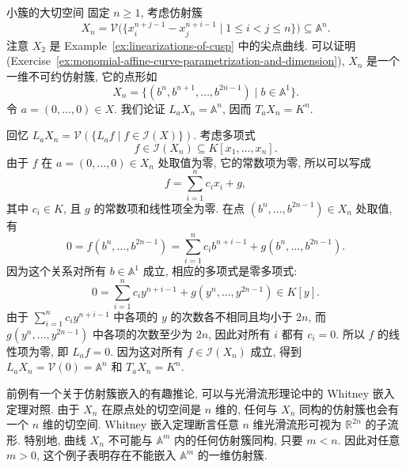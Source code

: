 \begin{Example}{小簇的大切空间}\leavevmode\label{ex:curves-with-arbitrarily-large-tangent-spaces}
固定 $n\geq1$, 考虑仿射簇
\[
  X_{n}=\mathcal{V}\bigl(\{x_{i}^{n+j-1}-x_{j}^{n+i-1}\mid1\leq i<j\leq n\}\bigr)
    \subseteq\mathbb{A}^{n}.
\]
注意 $X_{2}$ 是 Example~\ref{ex:linearizations-of-cusp} 中的尖点曲线. 可以证明 (Exercise~\ref{ex:monomial-affine-curve-parametrization-and-dimension}), $X_{n}$ 是一个一维不可约仿射簇, 它的点形如
\[
  X_{n}=\{(b^{n},b^{n+1},\ldots,b^{2n-1})\mid b\in\mathbb{A}^{1}\}.
\]
令 $a=(0,\ldots,0)\in X$. 我们论证 $L_{a}X_{n}=\mathbb{A}^{n}$, 因而 $T_{a}X_{n}=K^{n}$.

回忆 $L_{a}X_{n}=\mathcal{V}(\{L_{a}f\mid f\in\mathcal{I}(X)\})$. 考虑多项式
\[
  f\in\mathcal{I}(X_{n})\subseteq K[x_{1},\ldots,x_{n}].
\]
由于 $f$ 在 $a=(0,\ldots,0)\in X_{n}$ 处取值为零, 它的常数项为零, 所以可以写成
\[
  f=\sum_{i=1}^{n}c_{i}x_{i}+g,
\]
其中 $c_{i}\in K$, 且 $g$ 的常数项和线性项全为零. 在点 $(b^{n},\ldots,b^{2n-1})\in X_{n}$ 处取值, 有
\[
  0=f(b^{n},\ldots,b^{2n-1})
  =\sum_{i=1}^{n}c_{i}b^{n+i-1}+g(b^{n},\ldots,b^{2n-1}).
\]
因为这个关系对所有 $b\in\mathbb{A}^{1}$ 成立, 相应的多项式是零多项式:
\[
  0=\sum_{i=1}^{n}c_{i}y^{n+i-1}+g(y^{n},\ldots,y^{2n-1})\in K[y].
\]
由于 $\sum_{i=1}^{n}c_{i}y^{n+i-1}$ 中各项的 $y$ 的次数各不相同且均小于 $2n$, 而 $g(y^{n},\ldots,y^{2n-1})$ 中各项的次数至少为 $2n$, 因此对所有 $i$ 都有 $c_{i}=0$. 所以 $f$ 的线性项为零, 即 $L_{a}f=0$. 因为这对所有 $f\in\mathcal{I}(X_{n})$ 成立, 得到 $L_{a}X_{n}=\mathcal{V}(0)=\mathbb{A}^{n}$ 和 $T_{a}X_{n}=K^{n}$.
\end{Example}

\BookPairedNote
  {前例有一个关于仿射簇嵌入的有趣推论, 可以与光滑流形理论中的 Whitney 嵌入定理对照. 由于 $X_{n}$ 在原点处的切空间是 $n$ 维的, 任何与 $X_{n}$ 同构的仿射簇也会有一个 $n$ 维的切空间.}
  {Whitney 嵌入定理断言任意 $n$ 维光滑流形可视为 $\mathbb{R}^{2n}$ 的子流形.}
特别地, 曲线 $X_{n}$ 不可能与 $\mathbb{A}^{m}$ 内的任何仿射簇同构, 只要 $m<n$. 因此对任意 $m>0$, 这个例子表明存在不能嵌入 $\mathbb{A}^{m}$ 的一维仿射簇.

